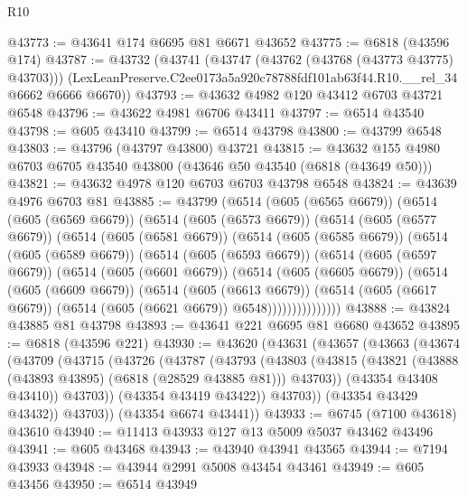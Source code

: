 \begin{lexlean}{R10}
\begin{coremodule}
@43773 := @43641 @174 @6695 @81 @6671 @43652
@43775 := @6818 (@43596 @174)
@43787 := @43732
    (@43741
      (@43747 (@43762 (@43768 (@43773 @43775) @43703)))
      (LexLeanPreserve.C2ee0173a5a920c78788fdf101ab63f44.R10.__rel_34 @6662 @6666 @6670))
@43793 := @43632 @4982 @120 @43412 @6703 @43721 @6548
@43796 := @43622 @4981 @6706 @43411
@43797 := @6514 @43540
@43798 := @605 @43410
@43799 := @6514 @43798
@43800 := @43799 @6548
@43803 := @43796 (@43797 @43800) @43721
@43815 := @43632 @155 @4980 @6703 @6705 @43540 @43800 (@43646 @50 @43540 (@6818 (@43649 @50)))
@43821 := @43632 @4978 @120 @6703 @6703 @43798 @6548
@43824 := @43639 @4976 @6703 @81
@43885 := @43799
    (@6514
      (@605 (@6565 @6679))
      (@6514
        (@605 (@6569 @6679))
        (@6514
          (@605 (@6573 @6679))
          (@6514
            (@605 (@6577 @6679))
            (@6514
              (@605 (@6581 @6679))
              (@6514
                (@605 (@6585 @6679))
                (@6514
                  (@605 (@6589 @6679))
                  (@6514
                    (@605 (@6593 @6679))
                    (@6514
                      (@605 (@6597 @6679))
                      (@6514
                        (@605 (@6601 @6679))
                        (@6514
                          (@605 (@6605 @6679))
                          (@6514
                            (@605 (@6609 @6679))
                            (@6514
                              (@605 (@6613 @6679))
                              (@6514
                                (@605 (@6617 @6679))
                                (@6514 (@605 (@6621 @6679)) @6548)))))))))))))))
@43888 := @43824 @43885 @81 @43798
@43893 := @43641 @221 @6695 @81 @6680 @43652
@43895 := @6818 (@43596 @221)
@43930 := @43620
    (@43631
      (@43657
        (@43663
          (@43674
            (@43709
              (@43715
                (@43726
                  (@43787
                    (@43793
                      (@43803
                        (@43815
                          (@43821 (@43888 (@43893 @43895) (@6818 (@28529 @43885 @81))) @43703))
                        (@43354 @43408 @43410))
                      @43703))
                  (@43354 @43419 @43422))
                @43703))
            (@43354 @43429 @43432))
          @43703))
      (@43354 @6674 @43441))
@43933 := @6745 (@7100 @43618) @43610
@43940 := @11413 @43933 @127 @13 @5009 @5037 @43462 @43496
@43941 := @605 @43468
@43943 := @43940 @43941 @43565
@43944 := @7194 @43933
@43948 := @43944 @2991 @5008 @43454 @43461
@43949 := @605 @43456
@43950 := @6514 @43949

\end{coremodule}
\end{lexlean}
